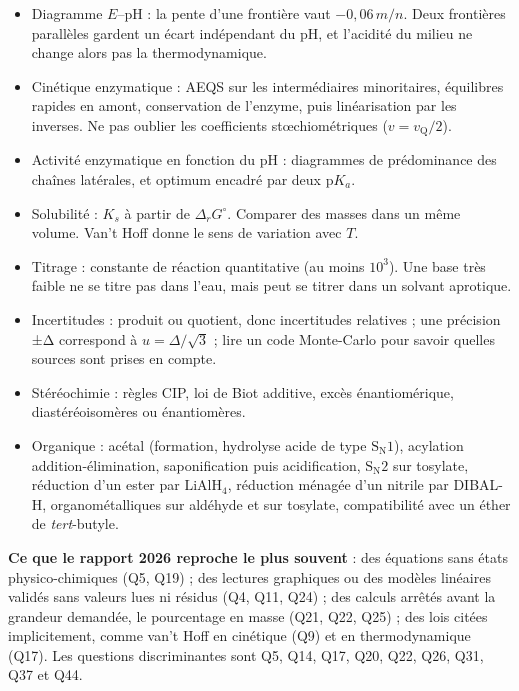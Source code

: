 \documentclass[11pt,a4paper]{article}
\providecommand{\tightlist}{\setlength{\itemsep}{0pt}\setlength{\parskip}{0pt}}
\begin{document}
\begin{itemize}
\tightlist
\item
  Diagramme \(E\)--pH : la pente d'une frontière vaut \(-0{,}06\,m/n\). Deux frontières parallèles gardent un écart indépendant du pH, et l'acidité du milieu ne change alors pas la thermodynamique.
\item
  Cinétique enzymatique : AEQS sur les intermédiaires minoritaires, équilibres rapides en amont, conservation de l'enzyme, puis linéarisation par les inverses. Ne pas oublier les coefficients stœchiométriques (\(v = v_{\mathrm Q}/2\)).
\item
  Activité enzymatique en fonction du pH : diagrammes de prédominance des chaînes latérales, et optimum encadré par deux p\(K_a\).
\item
  Solubilité : \(K_s\) à partir de \(\Delta_rG^\circ\). Comparer des masses dans un même volume. Van't Hoff donne le sens de variation avec \(T\).
\item
  Titrage : constante de réaction quantitative (au moins \(10^3\)). Une base très faible ne se titre pas dans l'eau, mais peut se titrer dans un solvant aprotique.
\item
  Incertitudes : produit ou quotient, donc incertitudes relatives ; une précision ±Δ correspond à \(u = \Delta/\sqrt3\) ; lire un code Monte-Carlo pour savoir quelles sources sont prises en compte.
\item
  Stéréochimie : règles CIP, loi de Biot additive, excès énantiomérique, diastéréoisomères ou énantiomères.
\item
  Organique : acétal (formation, hydrolyse acide de type \(\mathrm{S_N1}\)), acylation addition-élimination, saponification puis acidification, \(\mathrm{S_N2}\) sur tosylate, réduction d'un ester par \(\mathrm{LiAlH_4}\), réduction ménagée d'un nitrile par DIBAL-H, organométalliques sur aldéhyde et sur tosylate, compatibilité avec un éther de \emph{tert}-butyle.
\end{itemize}

\textbf{Ce que le rapport 2026 reproche le plus souvent} : des équations sans états physico-chimiques (Q5, Q19) ; des lectures graphiques ou des modèles linéaires validés sans valeurs lues ni résidus (Q4, Q11, Q24) ; des calculs arrêtés avant la grandeur demandée, le pourcentage en masse (Q21, Q22, Q25) ; des lois citées implicitement, comme van't Hoff en cinétique (Q9) et en thermodynamique (Q17). Les questions discriminantes sont Q5, Q14, Q17, Q20, Q22, Q26, Q31, Q37 et Q44.
\end{document}
